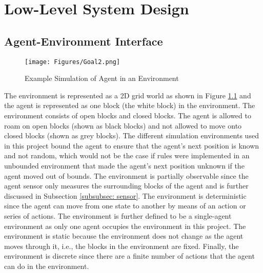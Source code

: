 






\chapter{Low-Level System Design} 
\label{LL_design}


\section{Agent-Environment Interface}

\begin{figure}[H]
    \centering
    \texttt{[image: Figures/Goal2.png]}
    \caption{Example Simulation of Agent in an Environment} 
    \label{fig:agent_in_env_low_level}
\end{figure}


The environment is represented as a 2D grid world as shown in Figure \ref{fig:agent_in_env_low_level} and the agent is represented as one block (the white block) in the environment. The environment consists of open blocks and closed blocks. The agent is allowed to roam on open blocks (shown as black blocks) and not allowed to move onto closed blocks (shown as grey blocks). The different simulation environments used in this project bound the agent to ensure that the agent's next position is known and not random, which would not be the case if rules were implemented in an unbounded environment that made the agent's next position unknown if the agent moved out of bounds.
The environment is partially observable since the agent sensor only measures the surrounding blocks of the agent and is further discussed in Subsection \ref{subsubsec: sensor}. The environment is deterministic since the agent can move from one state to another by means of an action or series of actions. The environment is further defined to be a single-agent environment as only one agent occupies the environment in this project. The environment is static because the environment does not change as the agent moves through it, i.e., the blocks in the environment are fixed. Finally, the environment is discrete since there are a finite number of actions that the agent can do in the environment.


